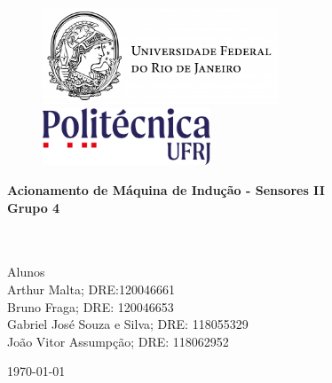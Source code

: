 \documentclass[a4paper, 11pt]{article}
\begin{document}
    \begin{titlepage}
    	\begin{center}
            \begin{figure}[H]
                \centering
                \includegraphics[width=7cm]{images/ufrj-logo.png}
                \hspace{1cm}
                \includegraphics[width=5cm]{images/poli-logo.png}
            \end{figure}
            \vspace{85pt}
            
            
            \textbf{\LARGE{Acionamento de Máquina de Indução - Sensores II}}
            \large{\\}
            \vspace{50pt}
            \textbf{\LARGE{Grupo 4}}
            \large{\\}
            \vspace{160pt}
            
        \end{center}
        	
        \begin{flushleft}
        	\begin{tabbing}
        	    \\\\
        		Alunos\qquad\qquad\= \\
                \qquad\qquad Arthur Malta;  DRE:120046661\\
                \qquad\qquad Bruno Fraga; DRE: 120046653\\
                \qquad\qquad Gabriel José Souza e Silva; DRE: 118055329\\
                \qquad\qquad João Vitor Assumpção; DRE: 118062952\\
            \end{tabbing}
        \end{flushleft}
        	
        \begin{center}
        	\vspace{\fill}
        	    \today
        \end{center}
    \end{titlepage}
    \newpage
    \tableofcontents
    \thispagestyle{empty}
    
\end{document}
